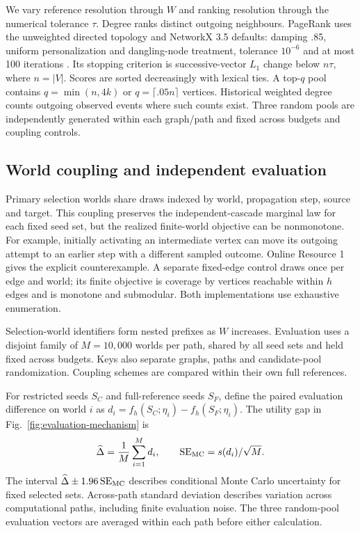 \documentclass[smallextended]{svjour3}
\begin{document}
We vary reference resolution through $W$ and ranking resolution through the numerical tolerance $\tau$. Degree ranks distinct outgoing neighbours. PageRank uses the unweighted directed topology and NetworkX 3.5 defaults: damping .85, uniform personalization and dangling-node treatment, tolerance $10^{-6}$ and at most 100 iterations \cite{networkxpr}. Its stopping criterion is successive-vector $L_1$ change below $n\tau$, where $n=|V|$. Scores are sorted decreasingly with lexical ties. A top-$q$ pool contains $q=\min(n,4k)$ or $q=\lceil .05n\rceil$ vertices. Historical weighted degree counts outgoing observed events where such counts exist. Three random pools are independently generated within each graph/path and fixed across budgets and coupling controls.

\subsection{World coupling and independent evaluation}\label{sec:coupling}
Primary selection worlds share draws indexed by world, propagation step, source and target. This coupling preserves the independent-cascade marginal law for each fixed seed set, but the realized finite-world objective can be nonmonotone. For example, initially activating an intermediate vertex can move its outgoing attempt to an earlier step with a different sampled outcome. Online Resource 1 gives the explicit counterexample. A separate fixed-edge control draws once per edge and world; its finite objective is coverage by vertices reachable within $h$ edges and is monotone and submodular. Both implementations use exhaustive enumeration.

Selection-world identifiers form nested prefixes as $W$ increases. Evaluation uses a disjoint family of $M=10,000$ worlds per path, shared by all seed sets and held fixed across budgets. Keys also separate graphs, paths and candidate-pool randomization. Coupling schemes are compared within their own full references.

For restricted seeds $S_C$ and full-reference seeds $S_F$, define the paired evaluation difference on world $i$ as $d_i=f_h(S_C;\eta_i)-f_h(S_F;\eta_i)$. The utility gap in Fig.~\ref{fig:evaluation-mechanism} is
\begin{equation}
\widehat\Delta=\frac{1}{M}\sum_{i=1}^{M}d_i,
\qquad \operatorname{SE}_{\rm MC}=s(d_i)/\sqrt M.
\end{equation}
The interval $\widehat\Delta\pm1.96\operatorname{SE}_{\rm MC}$ describes conditional Monte Carlo uncertainty for fixed selected sets. Across-path standard deviation describes variation across computational paths, including finite evaluation noise. The three random-pool evaluation vectors are averaged within each path before either calculation.
\end{document}
